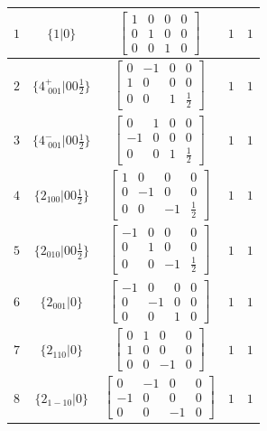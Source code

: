 \documentclass[fleqn,8pt]{jsarticle}
\begin{document}
\begin{longtable}{ccccc}
$ 1 $ & $ \{1|0\} $ & $ \begin{bmatrix} 1 & 0 & 0 & 0 \\ 0 & 1 & 0 & 0 \\ 0 & 0 & 1 & 0 \end{bmatrix} $ & $ 1 $ & $ 1 $ \\ \hline
$ 2 $ & $ \{4^{+}_{\,\,001}|0 0 \frac{1}{2}\} $ & $ \begin{bmatrix} 0 & -1 & 0 & 0 \\ 1 & 0 & 0 & 0 \\ 0 & 0 & 1 & \frac{1}{2} \end{bmatrix} $ & $ 1 $ & $ 1 $ \\ \hline
$ 3 $ & $ \{4^{-}_{\,\,001}|0 0 \frac{1}{2}\} $ & $ \begin{bmatrix} 0 & 1 & 0 & 0 \\ -1 & 0 & 0 & 0 \\ 0 & 0 & 1 & \frac{1}{2} \end{bmatrix} $ & $ 1 $ & $ 1 $ \\ \hline
$ 4 $ & $ \{2{}_{100}|0 0 \frac{1}{2}\} $ & $ \begin{bmatrix} 1 & 0 & 0 & 0 \\ 0 & -1 & 0 & 0 \\ 0 & 0 & -1 & \frac{1}{2} \end{bmatrix} $ & $ 1 $ & $ 1 $ \\ \hline
$ 5 $ & $ \{2{}_{010}|0 0 \frac{1}{2}\} $ & $ \begin{bmatrix} -1 & 0 & 0 & 0 \\ 0 & 1 & 0 & 0 \\ 0 & 0 & -1 & \frac{1}{2} \end{bmatrix} $ & $ 1 $ & $ 1 $ \\ \hline
$ 6 $ & $ \{2{}_{001}|0\} $ & $ \begin{bmatrix} -1 & 0 & 0 & 0 \\ 0 & -1 & 0 & 0 \\ 0 & 0 & 1 & 0 \end{bmatrix} $ & $ 1 $ & $ 1 $ \\ \hline
$ 7 $ & $ \{2{}_{110}|0\} $ & $ \begin{bmatrix} 0 & 1 & 0 & 0 \\ 1 & 0 & 0 & 0 \\ 0 & 0 & -1 & 0 \end{bmatrix} $ & $ 1 $ & $ 1 $ \\ \hline
$ 8 $ & $ \{2{}_{1-10}|0\} $ & $ \begin{bmatrix} 0 & -1 & 0 & 0 \\ -1 & 0 & 0 & 0 \\ 0 & 0 & -1 & 0 \end{bmatrix} $ & $ 1 $ & $ 1 $ \\ \hline

\end{longtable}
\end{document}
